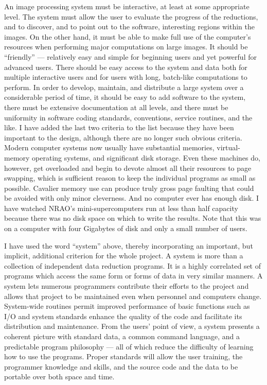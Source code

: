 \noindent An image processing system must be interactive, at least at some
appropriate level.  The system must allow the user to evaluate the
progress of the reductions, and to discover, and to point out to the
software, interesting regions within the images.  On the other hand, it
must be able to make full use of the computer's resources when
performing major computations on large images.  It should be ``friendly''
--- relatively easy and simple for beginning users and yet powerful for
advanced users.  There should be easy access to the system and data
both for multiple interactive users and for users with long, batch-like
computations to perform.  In order to develop, maintain, and distribute
a large system over a considerable period of time, it should be easy to
add software to the system, there must be extensive documentation at all
levels, and there must be uniformity in software coding standards,
conventions, service routines, and the like.  I have added the last two
criteria to the list because they have been important to the design,
although there are no longer such obvious criteria.  Modern computer
systems now usually have substantial memories, virtual-memory operating
systems, and significant disk storage.  Even these machines do, however,
get overloaded and begin to devote almost all their resources to page
swapping, which is sufficient reason to keep the individual programs as
small as possible.  Cavalier memory use can produce truly gross page
faulting that could be avoided with only minor cleverness.  And no
computer ever has enough disk.  I have watched NRAO's
mini-supercomputers run at less than half capacity because
there was no disk space on which to write the results.  Note that this
was on a computer with four Gigabytes of disk and only a small number
of users.\pd

     I have used the word ``system'' above, thereby incorporating an
important, but implicit, additional criterion for the whole project.  A
system is more than a collection of independent data reduction programs.
It is a highly correlated set of programs which access the same form or
forms of data in very similar manners.  A system lets numerous programmers
contribute their efforts to the project and allows that project to be
maintained even when personnel and computers change.  System-wide routines
permit improved performance of basic functions such as I/O and system
standards enhance the quality of the code and facilitate its distribution
and maintenance.  From the users' point of view, a system presents a
coherent picture with standard data, a common command language, and a
predictable program philosophy --- all of which reduce the difficulty
of learning how to use the programs.  Proper standards will allow the
user training, the programmer knowledge and skills, and the source
code and the data to be portable over both space and time.

